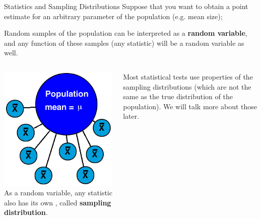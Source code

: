 \begin{frame}{Statistics and Sampling Distributions}
  Suppose that you want to obtain a point estimate for an arbitrary parameter of the population (e.g. mean size);\medskip

  Random samples of the population can be interpreted as a {\bf random variable}, and any function of these samples (any statistic) will
  be a random variable as well.\medskip

  \begin{columns}
      \includegraphics[width=1\textwidth]{../img/sampling_distribution}
      As a random variable, any statistic also has its own , called {\bf sampling distribution}.\bigskip

      Most statistical tests use properties of the sampling distributions (which are not the same as the true distribution of the population). We will talk more about those later.
  \end{columns}

\end{frame}

